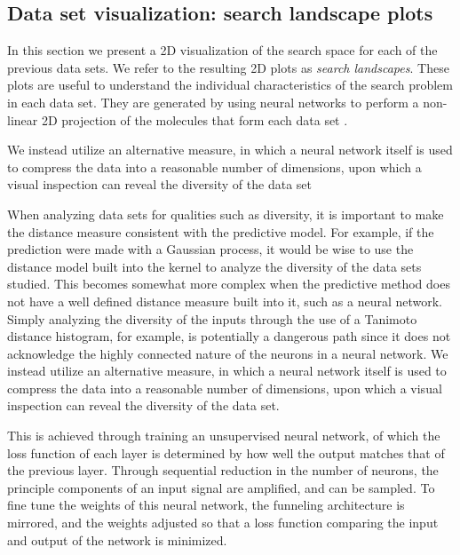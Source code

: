 \subsection{Data set visualization: search landscape plots}

In this section we present a 2D visualization of the search space for each of the previous data sets. We refer to the resulting 2D plots as \emph{search landscapes}. These plots are useful to understand the individual characteristics of the search problem in each data set. They are generated by using neural networks to perform a non-linear 2D projection of the molecules that form each data set \cite{Hinton_2006}.

We instead utilize an alternative measure, in which a neural network itself is used to compress the data into a reasonable number of dimensions,  upon which a visual inspection can reveal the diversity of the data set

When analyzing data sets for qualities such as diversity, it is important to make the distance measure consistent with the predictive model.  For example, if the prediction were made with a Gaussian process, it would be wise to use the distance model built into the kernel to analyze the diversity of the data sets studied.  This becomes somewhat more complex when the predictive method does not have a well defined distance measure built into it, such as a neural network.  Simply analyzing the diversity of the inputs through the use of a Tanimoto distance histogram, for example, is potentially a dangerous path since it does not acknowledge the highly connected nature of the neurons in a neural network.  We instead utilize an alternative measure, in which a neural network itself is used to compress the data into a reasonable number of dimensions, \cite{Hinton_2006} upon which a visual inspection can reveal the diversity of the data set.

This is achieved through training an unsupervised neural network, of which the loss function of each layer is determined by how well the output matches that of the previous layer.  Through sequential reduction in the number of neurons, the principle components of an input signal are amplified, and can be sampled.  To fine tune the weights of this neural network, the funneling architecture is mirrored, and the weights adjusted so that a loss function comparing the input and output of the network is minimized.

